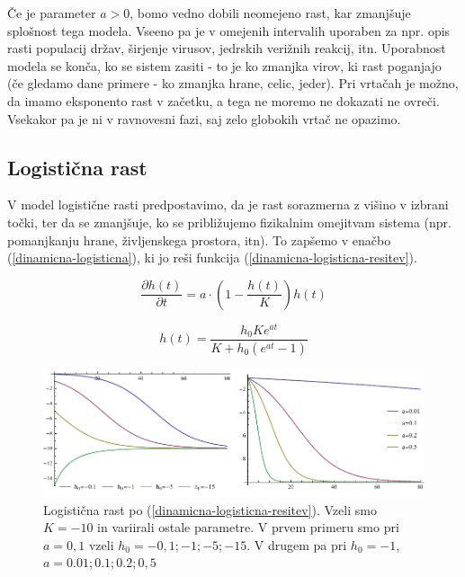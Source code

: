 \documentclass[a4paper, oneside, 12pt]{book}
\begin{document}
          Če je parameter $a > 0$, bomo vedno dobili neomejeno rast, kar zmanjšuje splošnost tega modela. Vseeno pa je v omejenih intervalih uporaben za npr. opis rasti populacij držav, širjenje virusov, jedrskih verižnih reakcij, itn. Uporabnost modela se konča, ko se sistem zasiti - to je ko zmanjka virov, ki rast poganjajo (če gledamo dane primere - ko zmanjka hrane, celic, jeder).
          Pri vrtačah je možno, da imamo eksponento rast v začetku, a tega ne moremo ne dokazati ne ovreči. Vsekakor pa je ni v ravnovesni fazi, saj zelo globokih vrtač ne opazimo.


          \subsection{Logistična rast}

          V model logistične rasti predpostavimo, da je rast sorazmerna z višino v izbrani točki, ter da se zmanjšuje, ko se približujemo fizikalnim omejitvam sistema (npr. pomanjkanju hrane, življenskega prostora, itn). To zapšemo v enačbo (\ref{dinamicna-logisticna}), ki jo reši funkcija (\ref{dinamicna-logisticna-resitev}).

          \begin{equation}
            \frac{\partial h(t)}{\partial t} = a \cdot \left( 1 - \frac{h(t)}{K} \right) h(t)
            \label{dinamicna-logisticna}
          \end{equation}

            \begin{equation}
            h(t) = \frac{h_0 K e^{a t}}{K + h_0 (e^{a t}-1)}
            \label{dinamicna-logisticna-resitev}
          \end{equation}

            \begin{figure}[h]
              \begin{center}
                \includegraphics[width=14cm]{slike/logisticna-rast}
              \end{center}
              \caption{Logistična rast po (\ref{dinamicna-logisticna-resitev}). Vzeli smo $K=-10$ in variirali ostale parametre. V prvem primeru smo pri $a=0,1$ vzeli $h_0=-0,1;-1;-5;-15$. V drugem pa pri $h_0=-1$, $a=0.01;0.1;0.2;0,5$}
              \label{fig:logisticna-rast}
            \end{figure}
\end{document}
